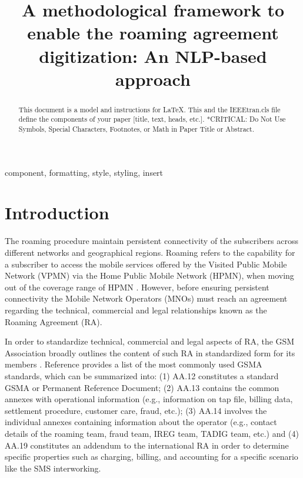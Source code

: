\documentclass[conference]{style/IEEEtran}
\begin{document}
\title{A methodological framework to enable the roaming agreement digitization: An NLP-based approach\\}

\maketitle

\begin{abstract}
This document is a model and instructions for \LaTeX.
This and the IEEEtran.cls file define the components of your paper [title, text, heads, etc.]. *CRITICAL: Do Not Use Symbols, Special Characters, Footnotes, 
or Math in Paper Title or Abstract.
\end{abstract}

\begin{IEEEkeywords}
component, formatting, style, styling, insert
\end{IEEEkeywords}

\section{Introduction}
The roaming procedure maintain persistent connectivity of the subscribers across different networks and geographical regions. Roaming refers to the capability for a subscriber to access the mobile services offered by the Visited Public Mobile Network (VPMN) via the Home Public Mobile Network (HPMN), when moving out of the coverage range of HPMN \cite{b1}. However, before ensuring persistent connectivity the Mobile Network Operators (MNOs) must reach an agreement regarding the technical, commercial and legal relationships known as the Roaming Agreement (RA).

In order to standardize technical, commercial and legal aspects of RA, the GSM Association broadly outlines the content of such RA in standardized form for its members \cite{b2}. Reference \cite{b3} provides a list of the most commonly used GSMA standards, which can be summarized into: (1) AA.12 constitutes a standard GSMA or Permanent Reference Document; (2) AA.13 contains the common annexes with operational information (e.g., information on tap file, billing data, settlement procedure, customer care, fraud, etc.); (3) AA.14 involves the individual annexes containing information about the operator (e.g., contact details of the roaming team, fraud team, IREG team, TADIG team, etc.) and (4) AA.19 constitutes an addendum to the international RA in order to determine specific properties such as charging, billing, and accounting for a specific scenario like the SMS interworking.
\end{document}
